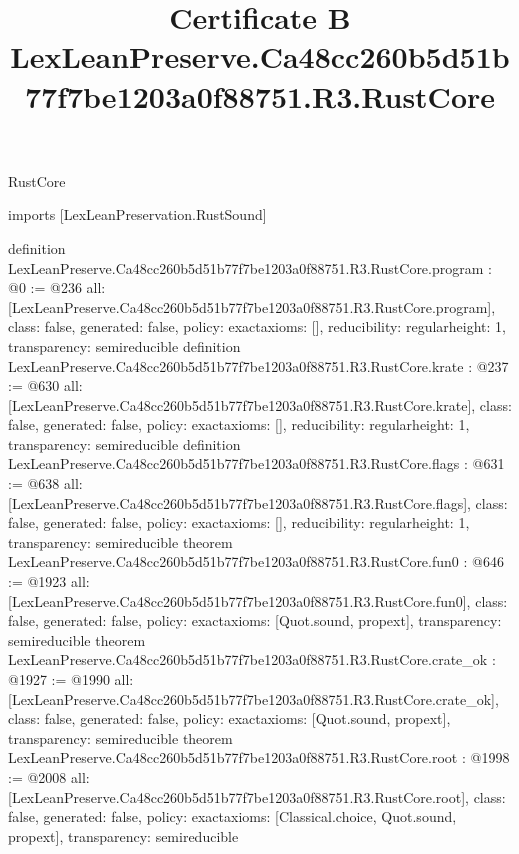 \begin{lexlean}{RustCore}
\title{Certificate B LexLeanPreserve.Ca48cc260b5d51b77f7be1203a0f88751.R3.RustCore}
\begin{coremodule}
imports [LexLeanPreservation.RustSound]

definition LexLeanPreserve.Ca48cc260b5d51b77f7be1203a0f88751.R3.RustCore.program : @0 := @236 {
  all: [LexLeanPreserve.Ca48cc260b5d51b77f7be1203a0f88751.R3.RustCore.program],
  class: false,
  generated: false,
  policy: exact{axioms: []},
  reducibility: regular{height: 1},
  transparency: semireducible
}
definition LexLeanPreserve.Ca48cc260b5d51b77f7be1203a0f88751.R3.RustCore.krate : @237 := @630 {
  all: [LexLeanPreserve.Ca48cc260b5d51b77f7be1203a0f88751.R3.RustCore.krate],
  class: false,
  generated: false,
  policy: exact{axioms: []},
  reducibility: regular{height: 1},
  transparency: semireducible
}
definition LexLeanPreserve.Ca48cc260b5d51b77f7be1203a0f88751.R3.RustCore.flags : @631 := @638 {
  all: [LexLeanPreserve.Ca48cc260b5d51b77f7be1203a0f88751.R3.RustCore.flags],
  class: false,
  generated: false,
  policy: exact{axioms: []},
  reducibility: regular{height: 1},
  transparency: semireducible
}
theorem LexLeanPreserve.Ca48cc260b5d51b77f7be1203a0f88751.R3.RustCore.fun0 : @646 := @1923 {
  all: [LexLeanPreserve.Ca48cc260b5d51b77f7be1203a0f88751.R3.RustCore.fun0],
  class: false,
  generated: false,
  policy: exact{axioms: [Quot.sound, propext]},
  transparency: semireducible
}
theorem LexLeanPreserve.Ca48cc260b5d51b77f7be1203a0f88751.R3.RustCore.crate_ok : @1927 := @1990 {
  all: [LexLeanPreserve.Ca48cc260b5d51b77f7be1203a0f88751.R3.RustCore.crate_ok],
  class: false,
  generated: false,
  policy: exact{axioms: [Quot.sound, propext]},
  transparency: semireducible
}
theorem LexLeanPreserve.Ca48cc260b5d51b77f7be1203a0f88751.R3.RustCore.root : @1998 := @2008 {
  all: [LexLeanPreserve.Ca48cc260b5d51b77f7be1203a0f88751.R3.RustCore.root],
  class: false,
  generated: false,
  policy: exact{axioms: [Classical.choice, Quot.sound, propext]},
  transparency: semireducible
}


\end{coremodule}
\end{lexlean}

